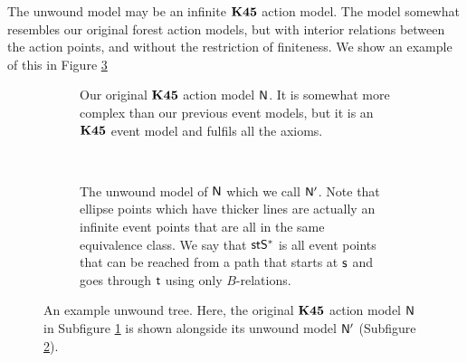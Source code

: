 The unwound model may be an infinite $\bf K45$ action model.
The model somewhat resembles our original forest action models,
but with interior relations between the action points, and without the
restriction of finiteness.
We show an example of this in Figure \ref{generatedTreeExample}

\begin{figure}
\centering
\begin{subfigure}[b]{.45\textwidth}
\centering
{}
\caption{Our original $\bf K45$ action model $\mathrm{\mathsf{N}}$.
It is somewhat more complex than our previous event models, but it is an $\bf K45$ event model and
fulfils all the axioms.}
\label{originalActionModel}
\end{subfigure}
~
\begin{subfigure}[b]{.45\textwidth}
\centering
{}
\caption{The unwound model of $\mathrm{\mathsf{N}}$ which we call $\mathrm{\mathsf{N}}'$. Note that ellipse points which
have thicker lines are actually an infinite event points that are all in the same equivalence class.
We say that $\mathrm{\mathsf{s}} \mathrm{\mathsf{t}} \mathrm{\mathsf{S}}^\ast$ is all event points that can be reached from a path that starts at $\mathrm{\mathsf{s}}$ and
goes through $\mathrm{\mathsf{t}}$ using only $B$-relations.}
\label{unwoundActionModel}
\end{subfigure}
\caption[Example of unwound tree]{An example unwound tree. Here, the original $\bf K45$ action model
$\mathrm{\mathsf{N}}$ in Subfigure \ref{originalActionModel} is shown alongside its unwound model $\mathrm{\mathsf{N}}'$
(Subfigure \ref{unwoundActionModel}). } \label{generatedTreeExample}
\end{figure}

